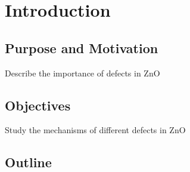 \addchapheadtotoc
\chapter{Introduction}
\section{Purpose and Motivation}
Describe the importance of defects in ZnO
\section{Objectives}
Study the mechanisms of different defects in ZnO
\section{Outline}

